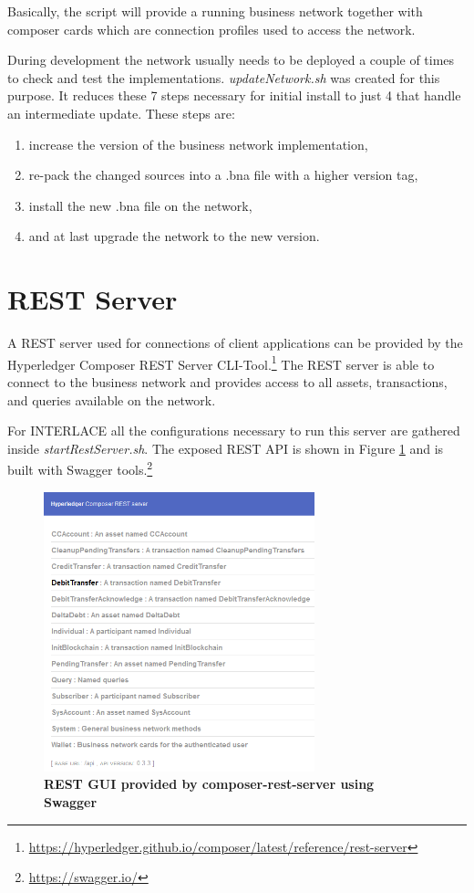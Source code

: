 Basically, the script will provide a running business network together with composer cards which are connection profiles used to access the network.

During development the network usually needs to be deployed a couple of times to check and test the implementations. \textit{updateNetwork.sh} was created for this purpose. It reduces these 7 steps necessary for initial install to just 4 that handle an intermediate update. These steps are:

\begin{enumerate}
	\item increase the version of the business network implementation,
	\item re-pack the changed sources into a .bna file with a higher version tag,
	\item install the new .bna file on the network,
	\item and at last upgrade the network to the new version.
\end{enumerate}

\section{REST Server}
\label{sec:rest-server}

A REST server used for connections of client applications can be provided by the Hyperledger Composer REST Server CLI-Tool.\footnote{\url{https://hyperledger.github.io/composer/latest/reference/rest-server}} The REST server is able to connect to the business network and provides access to all assets, transactions, and queries available on the network.

For INTERLACE all the configurations necessary to run this server are gathered inside \textit{startRestServer.sh}. The exposed REST API is shown in Figure \ref{fig:rest-swagger} and is built with Swagger tools.\footnote{\url{https://swagger.io/}}

\begin{figure}[htbp]
  \centering
  \includegraphics[width=0.7\textwidth]{Figures/rest-swagger}
  \caption{\bf\small REST GUI provided by composer-rest-server using Swagger}
  \label{fig:rest-swagger}
\end{figure}

